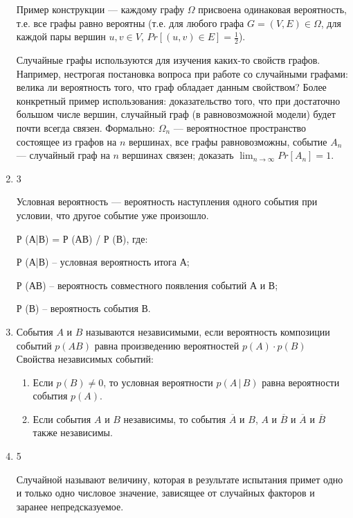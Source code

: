 \documentclass[a4paper,12pt]{article}
\begin{document}
\begin{enumerate}
    Пример конструкции --- каждому графу $\Omega$ присвоена одинаковая вероятность, т.е. все графы равно вероятны (т.е. для любого графа $G = (V, E) \in \Omega$, для каждой пары вершин $u, v \in V$, $Pr[(u, v) \in E] = \frac{1}{2}$).

    Случайные графы используются для изучения каких-то свойств графов. Например, нестрогая постановка вопроса при работе со случайными графами: велика ли вероятность того, что граф обладает данным свойством? Более конкретный пример использования: доказательство того, что при достаточно большом числе вершин, случайный граф (в равновозможной модели) будет почти всегда связен. Формально: $\Omega_n$ --- вероятностное пространство состоящее из графов на $n$ вершинах, все графы равновозможны, событие $A_n$ --- случайный граф на $n$ вершинах связен; доказать $ \lim_{n\to\infty} Pr[A_n] = 1 $.
    
	\item 3
    
    Условная вероятность — вероятность наступления одного события при условии, что другое событие уже произошло.
    
    Р (А|В) = Р (АВ) / Р (В), где: 
    
    
    Р (А|В) – условная вероятность итога А; 
    
    Р (АВ) – вероятность совместного появления событий А и В; 
    
    Р (В) – вероятность события В. 
    
        \item
        События $A$ и $B$ называются независимыми, если вероятность композиции событий $p(AB)$ равна произведению вероятностей 		$p(A)\cdot p(B)$
        \medskip\\
        Свойства независимых событий: \begin{enumerate}
            \item Если $p(B)\ne0$, то условная вероятности $p(A\,|\,B)$ равна вероятности события $p(A)$.
            \item Если события $A$ и $B$ независимы, то события $\overline{A}$ и $B$, $A$ и $\overline{B}$ и $\overline{A}$ и 	$\overline{B}$ также независимы.
        \end{enumerate}
	
	\item 5
    
	    Случайной называют величину, которая в результате испытания примет одно и только одно числовое значение, зависящее от случайных факторов и заранее непредсказуемое.


\end{enumerate}
\end{document}
